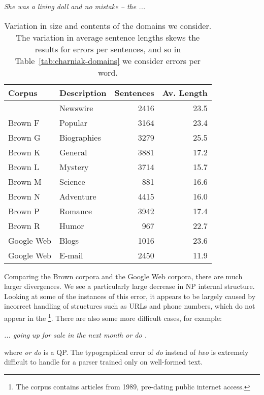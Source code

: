 \vspace{3mm}
\emph{She was a living doll and no mistake -- the ... }
\vspace{3mm}

\begin{table}
\begin{center}
\begin{tabular}{|llrr|}
	\hline
		Corpus & Description & Sentences & Av. Length \\
	\hline
	\hline
		\wsj 23 & Newswire & 2416 & 23.5 \\
		Brown F & Popular & 3164 & 23.4 \\
		Brown G & Biographies & 3279 & 25.5 \\
		Brown K & General & 3881 & 17.2 \\
		Brown L & Mystery & 3714 & 15.7 \\
		Brown M & Science & 881 & 16.6 \\
		Brown N & Adventure & 4415 & 16.0 \\
		Brown P & Romance & 3942 & 17.4 \\
		Brown R & Humor & 967 & 22.7 \\
		Google Web & Blogs & 1016 & 23.6 \\
		Google Web & E-mail & 2450 & 11.9 \\
	\hline
\end{tabular}
\caption[Variation in size and contents of the domains we consider.]{ \label{tab:domain-info}
	Variation in size and contents of the domains we consider.	The variation in
	average sentence lengths skews the results for errors per sentences, and so
	in Table~\ref{tab:charniak-domains} we consider errors per word.
}
\end{center}
\end{table}

Comparing the Brown corpora and the Google Web corpora, there are much larger
divergences.  We see a particularly large decrease in NP internal structure.
Looking at some of the instances of this error, it appears to be largely caused
by incorrect handling of structures such as URLs and phone numbers, which do
not appear in the \ptb\footnote{The corpus contains articles from 1989, pre-dating public internet access.}.
There are also some more difficult cases, for example:

\vspace{3mm}
\emph{... going up for sale in the next month or do .}
\vspace{3mm}

\noindent where \emph{or do} is a QP.
The typographical error of \emph{do} instead of \emph{two} is extremely difficult to handle for a parser trained only on well-formed text.

